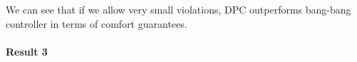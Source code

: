 We can see that if we allow very small violations, DPC outperforms bang-bang controller in terms of comfort guarantees.

\paragraph{Result 3} 

